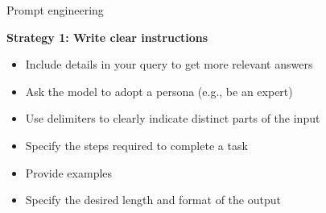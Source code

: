 \documentclass[11pt,compress,t,notes=noshow, xcolor=table]{beamer}
\begin{document}
\begin{vbframe}{Prompt engineering}

\vfill

\textbf{Strategy 1: Write clear instructions}


\begin{itemize}

\item     Include details in your query to get more relevant
    answers
\item         Ask the model to adopt a persona (e.g., be an expert)
\item             Use delimiters to clearly indicate distinct
    parts of the input
\item         Specify the steps required to complete a task
\item             Provide examples
\item                 Specify the desired length and format of the output

\end{itemize}

\vfill

\end{vbframe}
\end{document}

